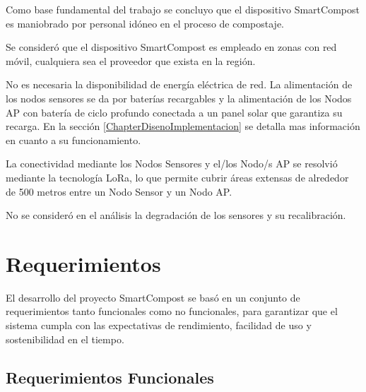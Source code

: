 Como base fundamental del trabajo se concluyo que el dispositivo SmartCompost es maniobrado por personal idóneo en el proceso de compostaje.

Se consideró que el dispositivo SmartCompost es empleado en zonas con red móvil, cualquiera sea el proveedor que exista en la región. 

No es necesaria la disponibilidad de energía eléctrica de red. La alimentación de los nodos sensores se da por baterías recargables y la alimentación de los Nodos AP con batería de ciclo profundo conectada a un panel solar que garantiza su recarga. En la sección \ref{ChapterDisenoImplementacion} se detalla mas información en cuanto a su funcionamiento.

La conectividad mediante los Nodos Sensores y el/los Nodo/s AP se resolvió mediante la tecnología LoRa, lo que permite cubrir áreas extensas de alrededor de 500 metros entre un Nodo Sensor y un Nodo AP.



No se consideró en el análisis la degradación de los sensores y su recalibración.





\section{Requerimientos} %

El desarrollo del proyecto SmartCompost se basó en un conjunto de requerimientos tanto funcionales como no funcionales, para garantizar que el sistema cumpla con las expectativas de rendimiento, facilidad de uso y sostenibilidad en el tiempo. 

\subsection{Requerimientos Funcionales}

